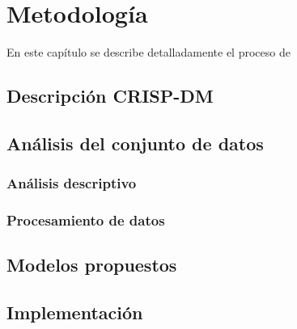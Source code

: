 \chapter{Metodología}\label{chapter:methods}

En este capítulo se describe detalladamente el proceso de


\section{Descripción CRISP-DM}

\section{Análisis del conjunto de datos}

\subsection{Análisis descriptivo}

\subsection{Procesamiento de datos}

\section{Modelos propuestos}

\section{Implementación}




